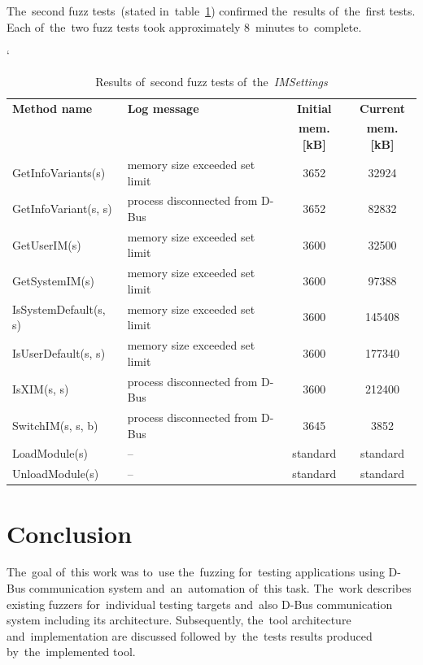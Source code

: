 The~second fuzz tests~(stated in~table~\ref{tab:tab5}) confirmed the~results
of~the~first tests. Each of~the~two fuzz tests took approximately 8~minutes
to~complete.\\


\FloatBarrier
\begin{table}[h!]
\catcode`
\caption{Results of~second fuzz tests of~the~\emph{IMSettings}}
\label{tab:tab5}
\begin{center}
	\begin{tabular}{| l | l | c | c |}
	\hline
	\textbf{Method name} & \textbf{Log message} & \textbf{Initial} & \textbf{Current} \\
	& & \textbf{mem. [kB]} & \textbf{mem. [kB]} \\ \hline
	GetInfoVariants(s) & memory size exceeded set limit & 3652 & 32924 \\ \hline
	GetInfoVariant(s, s) & process disconnected from D-Bus & 3652 & 82832 \\ \hline
	GetUserIM(s) & memory size exceeded set limit & 3600 & 32500 \\ \hline
	GetSystemIM(s) & memory size exceeded set limit & 3600 & 97388 \\ \hline
	IsSystemDefault(s, s) & memory size exceeded set limit & 3600 & 145408 \\ \hline
	IsUserDefault(s, s) & memory size exceeded set limit & 3600 & 177340 \\ \hline
	IsXIM(s, s) & process disconnected from D-Bus & 3600 & 212400 \\ \hline
	SwitchIM(s, s, b) & process disconnected from D-Bus & 3645 & 3852 \\ \hline
	LoadModule(s) & -- & standard & standard \\ \hline
	UnloadModule(s) & -- & standard & standard \\
	\hline
	\end{tabular}
\end{center}
\end{table}
\FloatBarrier



\chapter{Conclusion}
The~goal of~this work was to~use the~fuzzing for~testing applications using D-Bus
communication system and~an~automation of~this task. The~work describes existing
fuzzers for~individual testing targets and~also D-Bus communication system including
its architecture. Subsequently, the~tool architecture and~implementation are
discussed followed by~the~tests results produced by~the~implemented tool.\\

